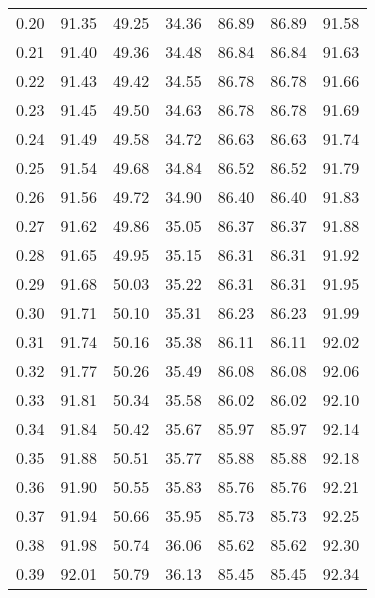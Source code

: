 \begin{tabular}{|c|c|c|c|c|c|c|}
      0.20 &     91.35 &     49.25 &      34.36 &   86.89 &      86.89 &         91.58 \\
      0.21 &     91.40 &     49.36 &      34.48 &   86.84 &      86.84 &         91.63 \\
      0.22 &     91.43 &     49.42 &      34.55 &   86.78 &      86.78 &         91.66 \\
      0.23 &     91.45 &     49.50 &      34.63 &   86.78 &      86.78 &         91.69 \\
      0.24 &     91.49 &     49.58 &      34.72 &   86.63 &      86.63 &         91.74 \\
      0.25 &     91.54 &     49.68 &      34.84 &   86.52 &      86.52 &         91.79 \\
      0.26 &     91.56 &     49.72 &      34.90 &   86.40 &      86.40 &         91.83 \\
      0.27 &     91.62 &     49.86 &      35.05 &   86.37 &      86.37 &         91.88 \\
      0.28 &     91.65 &     49.95 &      35.15 &   86.31 &      86.31 &         91.92 \\
      0.29 &     91.68 &     50.03 &      35.22 &   86.31 &      86.31 &         91.95 \\
      0.30 &     91.71 &     50.10 &      35.31 &   86.23 &      86.23 &         91.99 \\
      0.31 &     91.74 &     50.16 &      35.38 &   86.11 &      86.11 &         92.02 \\
      0.32 &     91.77 &     50.26 &      35.49 &   86.08 &      86.08 &         92.06 \\
      0.33 &     91.81 &     50.34 &      35.58 &   86.02 &      86.02 &         92.10 \\
      0.34 &     91.84 &     50.42 &      35.67 &   85.97 &      85.97 &         92.14 \\
      0.35 &     91.88 &     50.51 &      35.77 &   85.88 &      85.88 &         92.18 \\
      0.36 &     91.90 &     50.55 &      35.83 &   85.76 &      85.76 &         92.21 \\
      0.37 &     91.94 &     50.66 &      35.95 &   85.73 &      85.73 &         92.25 \\
      0.38 &     91.98 &     50.74 &      36.06 &   85.62 &      85.62 &         92.30 \\
      0.39 &     92.01 &     50.79 &      36.13 &   85.45 &      85.45 &         92.34 \\

\end{tabular}
